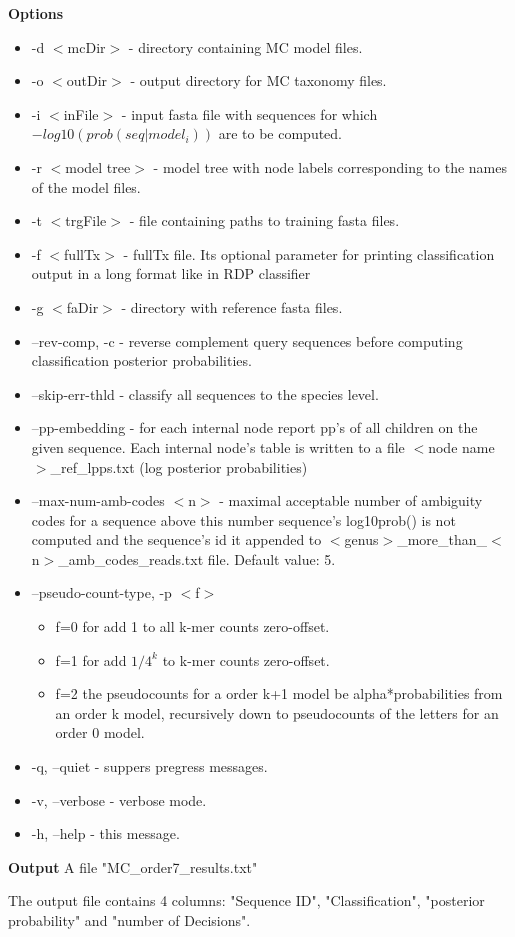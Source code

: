 \documentclass{article}
\newcommand{\<}{\ensuremath{<}}
\renewcommand{\>}{\ensuremath{>}}
\begin{document}
 \vspace{7pt}
\textbf{Options}
\tightlists
\begin{itemize}
\item -d \<mcDir\>      - directory containing MC model files.
\item -o \<outDir\>     - output directory for MC taxonomy files.
\item -i \<inFile\> - input fasta file with sequences for which
  $-log10(prob(seq | model_i))$ are to be computed.
\item -r \<model tree\> - model tree with node labels corresponding to the names
  of the model files.
\item -t \<trgFile\>    - file containing paths to training fasta files.
\item -f \<fullTx\>     - fullTx file. Its optional parameter for printing
  classification output in a long format like in RDP classifier
\item -g \<faDir\>      - directory with reference fasta files.
\item --rev-comp, -c          - reverse complement query sequences before
  computing classification posterior probabilities.
\item --skip-err-thld         - classify all sequences to the species level.
\item --pp-embedding          - for each internal node report pp's of all
  children on the given sequence. Each internal node's table is written to a file \<node name\>\_ref\_lpps.txt (log posterior probabilities)
\item --max-num-amb-codes \<n\> - maximal acceptable number of ambiguity codes for
  a sequence above this number sequence's log10prob() is not computed and the
  sequence's id it appended to \<genus\>\_more\_than\_\<n\>\_amb\_codes\_reads.txt file.
  Default value: 5.
\item --pseudo-count-type, -p \<f\>
\begin{itemize}
\item  f=0 for add 1 to all k-mer counts zero-offset.
\item f=1 for add $1/4^k$ to k-mer counts zero-offset.
\item f=2 the pseudocounts for a order k+1 model be alpha*probabilities from an
  order k model, recursively down to pseudocounts of the letters for an order 0
  model.
\end{itemize}
\item -q, --quiet           - suppers pregress messages.
\item -v, --verbose         - verbose mode.
\item -h, --help            - this message.
\end{itemize}

\noindent\textbf{Output} A file  "MC\_order7\_results.txt"

The output file contains 4 columns: "Sequence ID", "Classification", "posterior
probability" and "number of Decisions".
\end{document}

